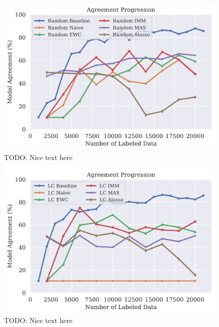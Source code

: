 \begin{figure}[h]
    \centering
    \includegraphics[width=0.8\linewidth]{images/results_CALMS/mnist_softmax_random.png}
    \caption[Agreement Comparison for Model Stealing on MNIST using the softmax output and the Active Learning strategy Random]{TODO: Nice text here}
    \label{fig:CALMSMNISTSoftmaxRandom}
\end{figure}

\begin{figure}[h]
    \centering
    \includegraphics[width=0.8\linewidth]{images/results_CALMS/mnist_softmax_lc.png}
    \caption[Agreement Comparison for Model Stealing on MNIST using the softmax output and the Active Learning strategy LC]{TODO: Nice text here}
    \label{fig:CALMSMNISTSoftmaxLC}
\end{figure}

